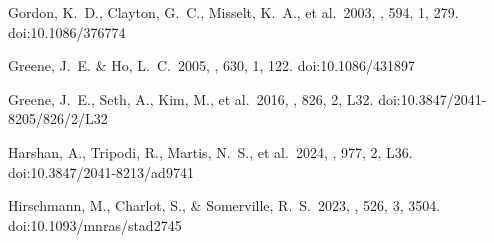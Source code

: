 \documentclass[trackchanges,twocolumn]{aastex701}
\begin{document}
 Gordon, K.~D., Clayton, G.~C., Misselt, K.~A., et al.\ 2003, \apj, 594, 1, 279. doi:10.1086/376774

 Greene, J.~E. \& Ho, L.~C.\ 2005, \apj, 630, 1, 122. doi:10.1086/431897

 Greene, J.~E., Seth, A., Kim, M., et al.\ 2016, \apjl, 826, 2, L32. doi:10.3847/2041-8205/826/2/L32

 Harshan, A., Tripodi, R., Martis, N.~S., et al.\ 2024, \apjl, 977, 2, L36. doi:10.3847/2041-8213/ad9741

 Hirschmann, M., Charlot, S., \& Somerville, R.~S.\ 2023, \mnras, 526, 3, 3504. doi:10.1093/mnras/stad2745
\end{document}

